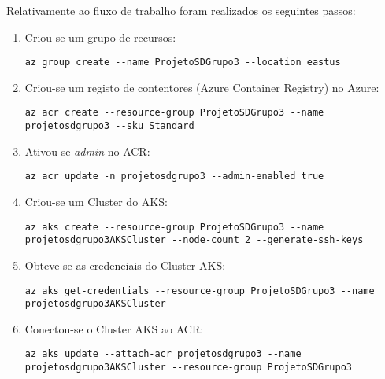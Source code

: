     \par Relativamente ao fluxo de trabalho foram realizados os seguintes passos:
    \begin{enumerate}
        \item Criou-se um grupo de recursos:

        \begin{verbatim}
az group create --name ProjetoSDGrupo3 --location eastus
        \end{verbatim}

        \item Criou-se um registo de contentores (Azure Container Registry) no Azure:

        \begin{verbatim}
az acr create --resource-group ProjetoSDGrupo3 --name projetosdgrupo3 --sku Standard
        \end{verbatim}

        \item Ativou-se \emph{admin} no ACR:

        \begin{verbatim}
az acr update -n projetosdgrupo3 --admin-enabled true
        \end{verbatim}

        \item Criou-se um Cluster do AKS:

        \begin{verbatim}
az aks create --resource-group ProjetoSDGrupo3 --name projetosdgrupo3AKSCluster --node-count 2 --generate-ssh-keys
        \end{verbatim}

        \item Obteve-se as credenciais do Cluster AKS:

        \begin{verbatim}
az aks get-credentials --resource-group ProjetoSDGrupo3 --name projetosdgrupo3AKSCluster
        \end{verbatim}

        \item Conectou-se o Cluster AKS ao ACR:

        \begin{verbatim}
az aks update --attach-acr projetosdgrupo3 --name projetosdgrupo3AKSCluster --resource-group ProjetoSDGrupo3
        \end{verbatim}



\end{enumerate}
